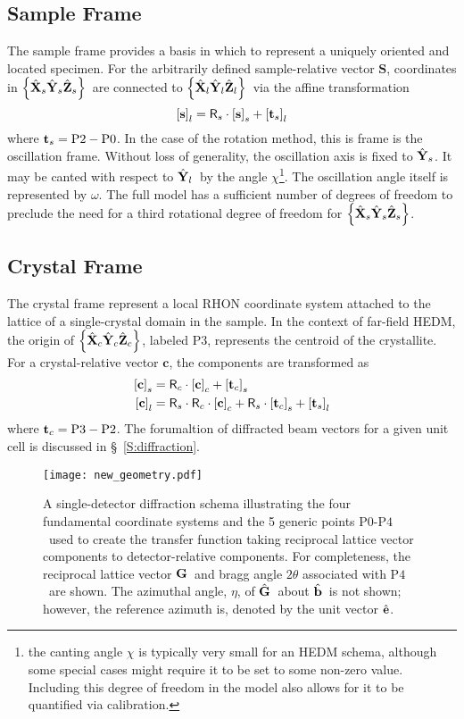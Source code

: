 \documentclass[12pt,letterpaper,final]{amsart}
\newcommand{\mbm}[1]{\ensuremath{\mbox{\boldmath$#1$}}}
\newcommand{\tvecs}{\ensuremath{\mbm{\mathrm{t}}_s}}
\newcommand{\tvecc}{\ensuremath{\mbm{\mathrm{t}}_c}}
\newcommand{\rmats}{\ensuremath{\mathsf{R}_s}}
\newcommand{\rmatc}{\ensuremath{\mathsf{R}_c}}
\newcommand{\gvec}{\ensuremath{\mbm{\mathrm{G}}}}
\newcommand{\ghat}{\ensuremath{\hat{\mbm{\mathrm{G}}}}}
\newcommand{\bhat}{\ensuremath{\hat{\mbm{\mathrm{b}}}}}
\newcommand{\ehat}{\ensuremath{\hat{\mbm{\mathrm{e}}}}}
\newcommand{\Pzero}{\ensuremath{\mathrm{P0}}}
\newcommand{\Ptwo}{\ensuremath{\mathrm{P2}}}
\newcommand{\Pthree}{\ensuremath{\mathrm{P3}}}
\newcommand{\Pfour}{\ensuremath{\mathrm{P4}}}
\newcommand{\Xl}{\ensuremath{\hat{\mbm{\mathrm{X}}}_l}}
\newcommand{\Yl}{\ensuremath{\hat{\mbm{\mathrm{Y}}}_l}}
\newcommand{\Zl}{\ensuremath{\hat{\mbm{\mathrm{Z}}}_l}}
\newcommand{\labframe}{\ensuremath{\left\{\Xl\Yl\Zl\right\}}}
\newcommand{\Xs}{\ensuremath{\hat{\mbm{\mathrm{X}}}_s}}
\newcommand{\Ys}{\ensuremath{\hat{\mbm{\mathrm{Y}}}_s}}
\newcommand{\Zs}{\ensuremath{\hat{\mbm{\mathrm{Z}}}_s}}
\newcommand{\samframe}{\ensuremath{\left\{\Xs\Ys\Zs\right\}}}
\newcommand{\Xc}{\ensuremath{\hat{\mbm{\mathrm{X}}}_c}}
\newcommand{\Yc}{\ensuremath{\hat{\mbm{\mathrm{Y}}}_c}}
\newcommand{\Zc}{\ensuremath{\hat{\mbm{\mathrm{Z}}}_c}}
\newcommand{\xtlframe}{\ensuremath{\left\{\Xc\Yc\Zc\right\}}}
\newcommand{\labcomps}[1]{\left[#1\right]_l}
\newcommand{\samcomps}[1]{\left[#1\right]_s}
\newcommand{\xtlcomps}[1]{\left[#1\right]_c}
\newcommand{\secref}[1]{\S~\ref{#1}}
\begin{document}
\subsection{Sample Frame}\label{S:sample}
The sample frame provides a basis in which to represent a uniquely
oriented and located specimen.  For the arbitrarily defined
sample-relative vector $\mathbf{S}$, coordinates in \samframe\ are
connected to \labframe\ via the affine transformation
\begin{equation}
  \labcomps{\mathbf{s}} = \rmats\cdot\samcomps{\mathbf{s}} + \labcomps{\tvecs}  
\end{equation}
where $\tvecs=\Ptwo-\Pzero$.  In the case of the rotation method, this
is frame is the oscillation frame.  Without loss of generality, the
oscillation axis is fixed to \Ys.  It may be canted with respect to
\Yl\ by the angle $\chi$\footnote{the canting angle $\chi$ is
  typically very small for an HEDM schema, although some special cases
  might require it to be set to some non-zero value.  Including this
  degree of freedom in the model also allows for it to be quantified
  via calibration.}.  The oscillation angle itself is represented by
$\omega$.  The full model has a sufficient number of degrees of
freedom to preclude the need for a third rotational degree of freedom
for \samframe.

\subsection{Crystal Frame}\label{S:crystal}
The crystal frame represent a local RHON coordinate system attached to
the lattice of a single-crystal domain in the sample.  In the context
of far-field HEDM, the origin of \xtlframe, labeled \Pthree,
represents the centroid of the crystallite.  For a crystal-relative
vector $\mathbf{c}$, the components are transformed as
\begin{align}
  \samcomps{\mathbf{c}} &= \rmatc\cdot\xtlcomps{\mathbf{c}} + \samcomps{\tvecc}\\
  \labcomps{\mathbf{c}} &= \rmats\cdot\rmatc\cdot\xtlcomps{\mathbf{c}} + \rmats\cdot\samcomps{\tvecc} + \labcomps{\tvecs}
\end{align}
where $\tvecc=\Pthree-\Ptwo$.  The forumaltion of diffracted beam vectors for a given unit cell is discussed in \secref{S:diffraction}.
\begin{figure}[htb]
  \centering
  \texttt{[image: new\_geometry.pdf]}
  \caption{A single-detector diffraction schema illustrating the four fundamental coordinate systems and the 5 generic points \Pzero-\Pfour\ used to create the transfer function taking reciprocal lattice vector components to detector-relative components.  For completeness, the reciprocal lattice vector \gvec\ and bragg angle $2\theta$ associated with \Pfour\ are shown.  The azimuthal angle, $\eta$, of \ghat\ about \bhat\ is not shown; however, the reference azimuth is, denoted by the unit vector \ehat. }
  \label{F:diffraction_schema}
\end{figure}
\end{document}
